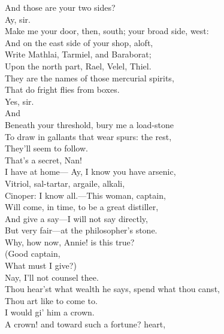 \documentclass[a4paper,oneside,12pt]{memoir}
\begin{document}
\begin{drama*}
\subtlespeaks {} And those are your two sides?\\
\druggerspeaks {} Ay, sir.\\
\subtlespeaks Make me your door, then, south; your broad side, west:\\
And on the east side of your shop, aloft,\\
Write Mathlai, Tarmiel, and Baraborat;\\
Upon the north part, Rael, Velel, Thiel.\\
They are the names of those mercurial spirits,\\
That do fright flies from boxes.\\
\druggerspeaks {} Yes, sir.\\
\subtlespeaks {} And\\
Beneath your threshold, bury me a load-stone\\
To draw in gallants that wear spurs: the rest,\\
They'll seem to follow.\\
\facespeaks {} That's a secret, Nan!\\
\druggerspeaks I have at home---
\subtlespeaks {} Ay, I know you have arsenic,\\
Vitriol, sal-tartar, argaile, alkali,\\
Cinoper: I know all.---This woman, captain,\\
Will come, in time, to be a great distiller,\\
And give a say---I will not say directly,\\
But very fair---at the philosopher's stone.\\
\facespeaks Why, how now, Annie! is this true?\\
\druggerspeaks {} (Good captain,\\
What must I give?)\\
\facespeaks {} Nay, I'll not counsel thee.\\
Thou hear'st what wealth he says, spend what thou canst,\\
Thou art like to come to.\\
\druggerspeaks {} I would gi' him a crown.\\
\facespeaks A crown! and toward such a fortune? heart,\\

\end{drama*}
\end{document}
